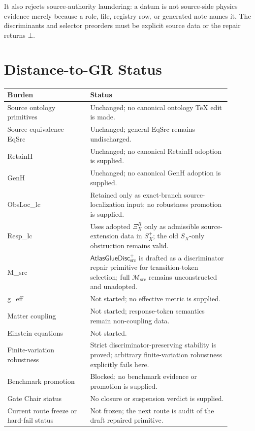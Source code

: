 \documentclass[11pt]{article}
\newcommand{\Msrc}{\mathcal{M}_{\mathrm{src}}}
\newcommand{\XiR}{\Xi_X^R}
\newcommand{\SX}{S_X}
\newcommand{\Splus}{S_X^+}
\newcommand{\AtlasGlueDisc}{\mathsf{AtlasGlueDisc}_{\mathrm{src}}^{+}}
\begin{document}
It also rejects source-authority laundering: a datum is not source-side
physics evidence merely because a role, file, registry row, or generated note
names it. The discriminants and selector preorders must be explicit source
data or the repair returns \(\bot\).

\section{Distance-to-GR Status}

\begin{center}
\begin{tabular}{p{0.33\linewidth}p{0.57\linewidth}}
\hline
Burden & Status \\
\hline
Source ontology primitives & Unchanged; no canonical ontology TeX edit is made. \\
Source equivalence EqSrc & Unchanged; general EqSrc remains undischarged. \\
RetainH & Unchanged; no canonical RetainH adoption is supplied. \\
GenH & Unchanged; no canonical GenH adoption is supplied. \\
ObsLoc\_lc & Retained only as exact-branch source-localization input; no robustness promotion is supplied. \\
Resp\_lc & Uses adopted \(\XiR\) only as admissible source-extension data in \(\Splus\); the old \(\SX\)-only obstruction remains valid. \\
M\_src & \(\AtlasGlueDisc\) is drafted as a discriminator repair primitive for transition-token selection; full \(\Msrc\) remains unconstructed and unadopted. \\
g\_eff & Not started; no effective metric is supplied. \\
Matter coupling & Not started; response-token semantics remain non-coupling data. \\
Einstein equations & Not started. \\
Finite-variation robustness & Strict discriminator-preserving stability is proved; arbitrary finite-variation robustness explicitly fails here. \\
Benchmark promotion & Blocked; no benchmark evidence or promotion is supplied. \\
Gate Chair status & No closure or suspension verdict is supplied. \\
Current route freeze or hard-fail status & Not frozen; the next route is audit of the draft repaired primitive. \\
\hline
\end{tabular}
\end{center}
\end{document}
